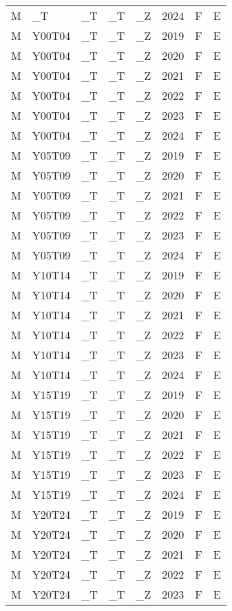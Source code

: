 \begin{longtable}[t]{llllllll}
M & \_T & \_T & \_T & \_Z & 2024 & F & E\\
M & Y00T04 & \_T & \_T & \_Z & 2019 & F & E\\
M & Y00T04 & \_T & \_T & \_Z & 2020 & F & E\\
\addlinespace
M & Y00T04 & \_T & \_T & \_Z & 2021 & F & E\\
M & Y00T04 & \_T & \_T & \_Z & 2022 & F & E\\
M & Y00T04 & \_T & \_T & \_Z & 2023 & F & E\\
M & Y00T04 & \_T & \_T & \_Z & 2024 & F & E\\
M & Y05T09 & \_T & \_T & \_Z & 2019 & F & E\\
\addlinespace
M & Y05T09 & \_T & \_T & \_Z & 2020 & F & E\\
M & Y05T09 & \_T & \_T & \_Z & 2021 & F & E\\
M & Y05T09 & \_T & \_T & \_Z & 2022 & F & E\\
M & Y05T09 & \_T & \_T & \_Z & 2023 & F & E\\
M & Y05T09 & \_T & \_T & \_Z & 2024 & F & E\\
\addlinespace
M & Y10T14 & \_T & \_T & \_Z & 2019 & F & E\\
M & Y10T14 & \_T & \_T & \_Z & 2020 & F & E\\
M & Y10T14 & \_T & \_T & \_Z & 2021 & F & E\\
M & Y10T14 & \_T & \_T & \_Z & 2022 & F & E\\
M & Y10T14 & \_T & \_T & \_Z & 2023 & F & E\\
\addlinespace
M & Y10T14 & \_T & \_T & \_Z & 2024 & F & E\\
M & Y15T19 & \_T & \_T & \_Z & 2019 & F & E\\
M & Y15T19 & \_T & \_T & \_Z & 2020 & F & E\\
M & Y15T19 & \_T & \_T & \_Z & 2021 & F & E\\
M & Y15T19 & \_T & \_T & \_Z & 2022 & F & E\\
\addlinespace
M & Y15T19 & \_T & \_T & \_Z & 2023 & F & E\\
M & Y15T19 & \_T & \_T & \_Z & 2024 & F & E\\
M & Y20T24 & \_T & \_T & \_Z & 2019 & F & E\\
M & Y20T24 & \_T & \_T & \_Z & 2020 & F & E\\
M & Y20T24 & \_T & \_T & \_Z & 2021 & F & E\\
\addlinespace
M & Y20T24 & \_T & \_T & \_Z & 2022 & F & E\\
M & Y20T24 & \_T & \_T & \_Z & 2023 & F & E\\

\end{longtable}
